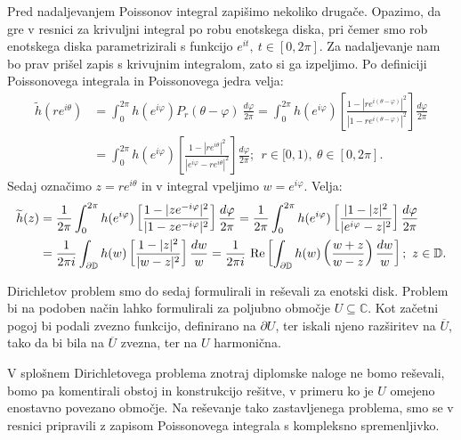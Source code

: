 \documentclass[mat1]{fmfdelo}
\begin{document}
    Pred nadaljevanjem Poissonov integral zapišimo nekoliko drugače. Opazimo, da gre v resnici za krivuljni integral po robu enotskega diska, pri čemer smo rob enotskega diska parametrizirali s funkcijo $e^{it},~t \in [0,2 \pi]$. 
    Za nadaljevanje nam bo prav prišel zapis s krivujnim integralom, zato si ga izpeljimo. Po definiciji Poissonovega integrala in Poissonovega jedra velja:
    \begin{align*}
        \widetilde{h}(r e^{i\theta}) &= \int_{0}^{2\pi}{h(e^{i\varphi}) P_r(\theta - \varphi)~\frac{d\varphi}{2 \pi}} = \int_{0}^{2\pi}{h(e^{i\varphi}) \left[\frac{1 - |r e^{i (\theta - \varphi)}|^2}{|1 - r e^{i (\theta - \varphi)}|^2}\right]\frac{d\varphi}{2 \pi}} \\
        & = \int_{0}^{2\pi}{h(e^{i\varphi}) \left[\frac{1 - |r e^{i \theta}|^2}{|e^{i \varphi} - r e^{i \theta}|^2}\right]\frac{d\varphi}{2 \pi}};~~ r \in [0,1),~\theta \in [0,2 \pi].
    \end{align*}
    Sedaj označimo $z = re^{i \theta}$ in v integral vpeljimo $w = e^{i \varphi}$. Velja:
    \begin{align}
        \label{pi_kompl}
        \widetilde{h}(z) &= \frac{1}{2 \pi}\int_{0}^{2\pi}{h(e^{i\varphi}) \left[\frac{1 - |ze^{ -i\varphi}|^2}{|1 - ze^{-i\varphi}|^2}\right]\frac{d\varphi}{2 \pi}}= \frac{1}{2\pi}\int_{0}^{2\pi}{h(e^{i\varphi}) \left[\frac{|1 - |z|^2}{|e^{i \varphi} - z|^2}\right]\frac{d\varphi}{2 \pi}} \notag \\
        & = \frac{1}{2\pi i}\int_{\partial \mathbb{D}}{h(w) \left[\frac{1 - |z|^2}{|w - z|^2}\right]\frac{dw}{w}} =  \frac{1}{2\pi i}~\text{Re}\left[\int_{\partial \mathbb{D}}{h(w) \left(\frac{w + z }{w - z}\right)\frac{dw}{w}}\right];~ z \in \mathbb{D}.
    \end{align}

    Dirichletov problem smo do sedaj formulirali in reševali za enotski disk. Problem bi na podoben način lahko formulirali za poljubno območje $U \subseteq \mathbb{C}$. 
    Kot začetni pogoj bi podali zvezno funkcijo, definirano na $\partial U$, ter iskali njeno razširitev na $\overline{U}$, tako da bi bila na $\overline{U}$ zvezna, ter na $U$ harmonična.
    
    V splošnem Dirichletovega problema znotraj diplomske naloge ne bomo reševali, bomo pa komentirali obstoj in konstrukcijo rešitve, v primeru ko je $U$ omejeno enostavno povezano območje.
    Na reševanje tako zastavljenega problema, smo se v resnici pripravili z zapisom Poissonovega integrala s kompleksno spremenljivko.
\end{document}

